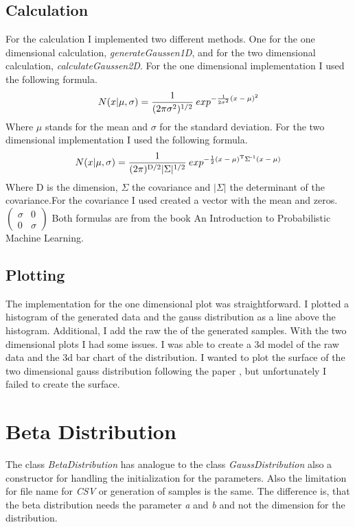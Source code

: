 \documentclass[10pt, a4paper, twocolumn]{article} %
\begin{document}
\subsection{Calculation}
For the calculation I implemented two different methods. One for the one dimensional calculation, \textit{generateGaussen1D}, and for the two dimensional calculation, \textit{calculateGaussen2D}. For the one dimensional implementation I used the following formula. 
\[
N(x|\mu,\sigma) = \frac{1}{(2\pi\sigma\textsuperscript{2})\textsuperscript{1/2}}\:exp
\textsuperscript{$-\frac{1}{2\sigma\textsuperscript{2}}(x-\mu)\textsuperscript{2}$}
\]
Where $\mu$ stands for the mean and $\sigma$ for the standard deviation. For the two dimensional implementation I used the following formula. 
\[
N(x|\mu,\sigma) = \frac{1}{(2\pi)\textsuperscript{D/2} \vert\Sigma\vert\textsuperscript{1/2}}\:exp\textsuperscript{$-\frac{1}{2}(x-\mu)\textsuperscript{T}\Sigma\textsuperscript{-1}(x-\mu)$}
\]
Where D is the dimension, $\Sigma$ the covariance and $\vert\Sigma\vert$ the determinant of the covariance.For the covariance I used created a vector with the mean and zeros.
$\begin{pmatrix}
\sigma & 0\\
0 & \sigma
\end{pmatrix}$
Both formulas are from the book An Introduction to Probabilistic Machine Learning.  
\citep{bookMachineLearning}

\subsection{Plotting}
The implementation for the one dimensional plot was straightforward. I plotted a histogram of the generated data and the gauss distribution as a line above the histogram. Additional, I add the raw the of the generated samples. With the two dimensional plots I had some issues. I was able to create a 3d model of the raw data and the 3d bar chart of the distribution. I wanted to plot the surface of the two dimensional gauss distribution following the paper \citep{multiVariateNormalDistribution}, but unfortunately I failed to create the surface. 

\section{Beta Distribution}
The class \textit{BetaDistribution} has analogue to the class \textit{GaussDistribution} also a constructor for handling the initialization for the parameters. Also the limitation for file name for \textit{CSV} or generation of samples is the same. The difference is, that the beta distribution needs the parameter \textit{a} and \textit{b} and not the dimension for the distribution. 
\end{document}
